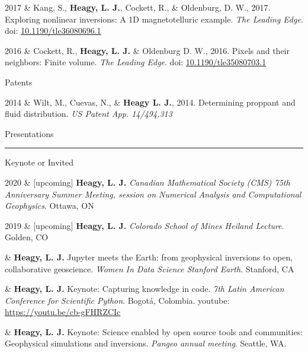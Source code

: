 \documentclass[a4paper, 11pt]{article}
\newcommand{\doi}[1]{doi: \href{https://doi.org/#1}{#1}}
\newcommand{\youtube}[1]{youtube: \href{https://youtu.be/XY3Tq9Wd1\_A}{#1}}
\newcommand{\heading}[1]{
    \begin{minipage}[t]{\textwidth}
    \vspace{0.05cm}
    {\LARGE #1}\\
    \vspace{-0.24cm}
    \hrule
    \end{minipage}
    \vspace{0.05cm}

}
\newcommand{\subheading}[1]{
    \vspace{0.4cm}
    {\Large #1}\\
    \vspace{-0.2cm}
}
\begin{document}
\begin{entryright}
2017 & Kang, S., \textbf{Heagy, L. J.}, Cockett, R., \& Oldenburg, D. W., 2017. Exploring nonlinear inversions: A 1D magnetotelluric example. \emph{The Leading Edge}. \doi{10.1190/tle36080696.1}
\end{entryright}

\begin{entryright}
2016 & Cockett, R., \textbf{Heagy, L. J.} \& Oldenburg D. W., 2016. Pixels and their neighbors: Finite volume. \emph{The Leading Edge}. \doi{10.1190/tle35080703.1}
\end{entryright}

\subheading{Patents}

\begin{entryright}
2014 & Wilt, M., Cuevas, N., \& \textbf{Heagy L. J.}, 2014. Determining proppant and fluid distribution. \emph{US Patent App. 14/494,313}
\end{entryright}



\heading{Presentations}

\subheading{Keynote or Invited}


\begin{entryright}
2020 & [upcoming] \textbf{Heagy, L. J.} \emph{Canadian Mathematical Society (CMS) 75th Anniversary Summer Meeting, session on Numerical Analysis and
Computational Geophysics}. Ottawa, ON
\end{entryright}


\begin{entryright}
2019 & [upcoming] \textbf{Heagy, L. J.} \emph{Colorado School of Mines Heiland Lecture}. Golden, CO
\end{entryright}

\begin{entryright}
& \textbf{Heagy, L. J.} Jupyter meets the Earth: from geophysical inversions to open, collaborative geoscience. \emph{Women In Data Science \@ Stanford Earth}. Stanford, CA
\end{entryright}

\begin{entryright}
& \textbf{Heagy, L. J.} Keynote: Capturing knowledge in code. \emph{7th Latin American Conference for Scientific Python}. Bogot\'a, Colombia. \youtube{https://youtu.be/cb-gFHRZCIc}
\end{entryright}

\begin{entryright}
& \textbf{Heagy, L. J.} Keynote: Science enabled by open source tools and communities: Geophysical simulations and inversions. \emph{Pangeo annual meeting}. Seattle, WA.
\end{entryright}
\end{document}
